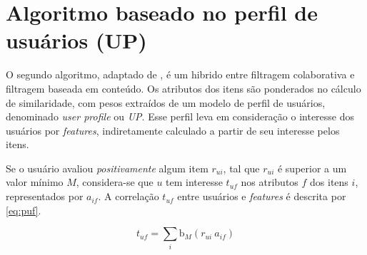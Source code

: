 


\section{Algoritmo baseado no perfil de usuários (UP)} %
\label{sec:algoritmo_baseado_no_perfil_de_usu_rios_}


O segundo algoritmo, adaptado de , é um hibrido entre filtragem colaborativa e filtragem baseada em conteúdo. Os atributos dos itens são ponderados no cálculo de similaridade, com pesos extraídos de um modelo de perfil de usuários, denominado \textit{user profile} ou \textit{UP}. Esse perfil leva em consideração o interesse dos usuários por \textit{features}, indiretamente calculado a partir de seu interesse pelos itens. 

Se o usuário avaliou \textit{positivamente} algum item $r_{ui}$, tal que $r_{ui}$ é superior a um valor mínimo $M$, considera-se que $u$ tem interesse $t_{uf}$ nos atributos $f$ dos itens $i$, representados por $a_{if}$. A correlação $t_{uf}$ entre usuários e \textit{features} é descrita por \ref{eq:puf}.

\begin{equation}
\label{eq:puf} 
    t_{uf} = \sum_{i}{\mathrm{b}_M\left(r_{ui}~a_{if}\right)} 
\end{equation} 

